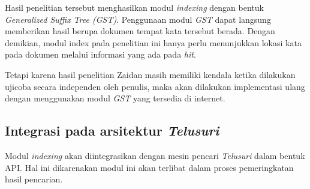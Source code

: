 Hasil penelitian tersebut menghasilkan modul \textit{indexing} dengan bentuk
\textit{Generalized Suffix Tree (GST)}. Penggunaan modul \textit{GST} dapat
langsung memberikan hasil berupa dokumen tempat kata tersebut berada. Dengan
demikian, modul index pada penelitian ini hanya perlu menunjukkan lokasi kata
pada dokumen melalui informasi yang ada pada \textit{hit}.

Tetapi karena hasil penelitian Zaidan masih memiliki kendala ketika dilakukan
ujicoba secara independen oleh penulis, maka akan dilakukan implementasi ulang
dengan menggunakan modul \textit{GST} yang tersedia di internet.


\subsection{Integrasi pada arsitektur \textit{Telusuri}}

Modul \textit{indexing} akan diintegrasikan dengan mesin pencari
\textit{Telusuri} dalam bentuk API. Hal ini dikarenakan modul ini akan terlibat
dalam proses pemeringkatan hasil pencarian.

